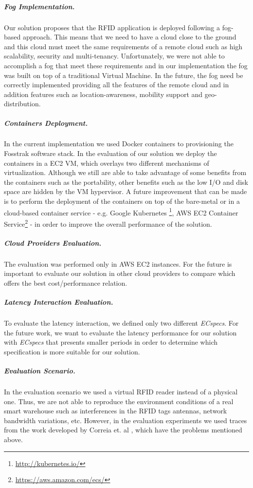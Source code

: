 \subparagraph{Fog Implementation.}
\label{subp:fog_impl}
Our solution proposes that the \gls{RFID} application is deployed following a fog-based approach.
This means that we need to have a cloud close to the ground and this cloud must meet the same
requirements of a remote cloud such as high scalability, security and multi-tenancy. Unfortunately,
we were not able to accomplish a fog that meet these requirements and in our implementation the fog
was built on top of a traditional Virtual Machine. In the future, the fog need be correctly
implemented providing all the features of the remote cloud and in addition features such as
location-awareness, mobility support and geo-distribution.

\subparagraph{Containers Deployment.}
\label{subp:containers_impl}
In the current implementation we used Docker containers to provisioning the Fosstrak software stack.
In the evaluation of our solution we deploy the containers in a \gls{EC2} \gls{VM}, which overlays two
different mechanisms of virtualization. Although we still are able to take advantage of some benefits
from the containers such as the portability, other benefits such as the low I/O and disk space are
hidden by the \gls{VM} hypervisor. A future improvement that can be made is to perform the deployment
of the containers on top of the bare-metal or in a cloud-based container service - e.g. Google Kubernetes
\footnote{\url{http://kubernetes.io/}}, \gls{AWS} \gls{EC2} Container Service\footnote{\url{https://aws.amazon.com/ecs/}} -
in order to improve the overall performance of the solution.

\subparagraph{Cloud Providers Evaluation.}
\label{subp:cloud_eval}
The evaluation was performed only in \gls{AWS} \gls{EC2} instances. For the future is important to
evaluate our solution in other cloud providers to compare which offers the best cost/performance
relation.

\subparagraph{Latency Interaction Evaluation.}
\label{subp:latency_eval}
To evaluate the latency interaction, we defined only two different \textit{ECspecs}. For the future work,
we want to evaluate the latency performance for our solution with \textit{ECspecs} that presents smaller
periods in order to determine which specification is more suitable for our solution.

\subparagraph{Evaluation Scenario.}
\label{subp:scenario_eval}
In the evaluation scenario we used a virtual \gls{RFID} reader instead of a physical one.
Thus, we are not able to reproduce the environment conditions of a real smart warehouse such as
interferences in the \gls{RFID} tags antennas, network bandwidth variations, etc. However, in the
evaluation experiments we used traces from the work developed by Correia et. al \cite{Correia:Thesis:2014},
which have the problems mentioned above.

